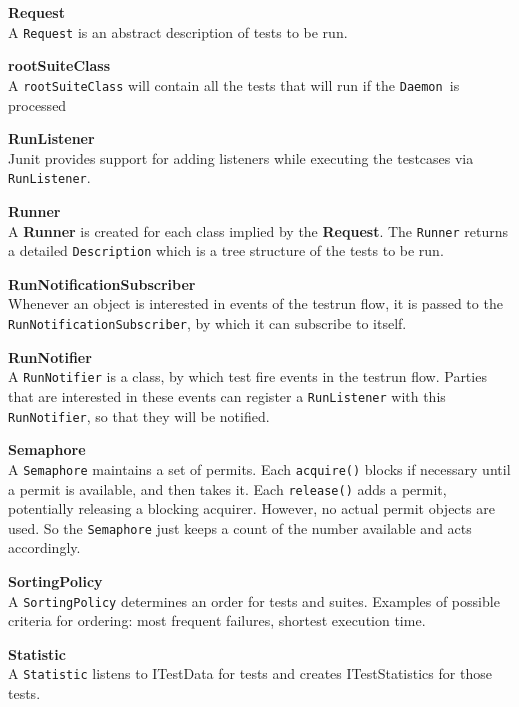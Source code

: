 \documentclass[i2]{oss}
\newcommand{\class}[1]{\texttt{#1}}
\newcommand{\method}[1]{\texttt{#1}}
\newcommand{\Deamon}{\class{Daemon  }}
\newcommand{\gloss}[1]{\textbf{#1}}
\begin{document}
\begin{description}
\item \gloss{Request} \\
A \class{Request} is an abstract description of tests to be run. 

\item \gloss{rootSuiteClass}\\
A \class{rootSuiteClass} will contain all the tests that will run if the \Deamon is processed

\item \gloss{RunListener} \\
Junit provides support for adding listeners while executing the testcases via \class{RunListener}. 

\item \gloss{Runner} \\  A \gloss{Runner} is created for each class implied by the \gloss{Request}. The \class{Runner} returns a detailed \class{Description} which is a tree structure of the tests to be run.

\item \gloss{RunNotificationSubscriber} \\
Whenever an object is interested in events of the testrun flow, it is passed to the \class{RunNotificationSubscriber}, by which it can subscribe to itself.


\item \gloss{RunNotifier} \\
A \class{RunNotifier} is a class, by which test fire events in the testrun flow.
Parties that are interested in these events can register a \class{RunListener} with this \class{RunNotifier}, so that they will be notified.

\item \gloss{Semaphore} \\
A \class{Semaphore} maintains a set of permits. Each \method{acquire()} blocks if necessary until a permit is available, and then takes it. Each \method{release()} adds a permit, potentially releasing a blocking acquirer. However, no actual permit objects are used. So the \class{Semaphore} just keeps a count of the number available and acts accordingly.

\item \gloss{SortingPolicy}\\
 A \class{SortingPolicy} determines an order for tests and suites. Examples of possible criteria for ordering: most frequent failures, shortest execution time.

\item \gloss{Statistic} \\
A \class{Statistic} listens to ITestData for tests and creates ITestStatistics for those tests.


\end{description}
\end{document}
